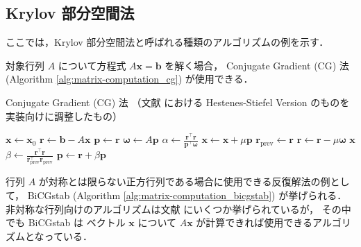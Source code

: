 \clearpage

\subsection{Krylov 部分空間法}\label{sec:linear_krylov-subspace-method}

ここでは，Krylov 部分空間法と呼ばれる種類のアルゴリズムの例を示す．

対象行列 $A$ について方程式 $A \bm{x} = \bm{b}$ を解く場合，
Conjugate Gradient (CG) 法 (Algorithm \ref{alg:matrix-computation_cg})
が使用できる．

\begin{algorithm}[tp]
    \caption{Conjugate Gradient (CG) 法 （文献 \cite{Golub2013} における Hestenes-Stiefel Version のものを実装向けに調整したもの）}
    \label{alg:matrix-computation_cg}
    \begin{algorithmic}[1]
        \State $\bm{x} \gets \bm{x}_0$
        \State $\bm{r} \gets \bm{b} - A \bm{x}$
        \State $\bm{p} \gets \bm{r}$
        \Loop
        \State $\bm{\omega} \gets A \bm{p}$
        \State $\alpha \gets \frac{\displaystyle \bm{r}^\top \bm{r}}{\displaystyle \bm{p}^\top \bm{\omega}}$
        \State $\bm{x} \gets \bm{x} + \mu \bm{p}$
        \State $\bm{r}_{\text{prev}} \gets \bm{r}$
        \State $\bm{r} \gets \bm{r} - \mu \bm{\omega}$
        \State \Return $\bm{x}$
        \EndIf
        \State $\beta \gets \frac{\displaystyle \bm{r}^\top \bm{r}}{\displaystyle \bm{r}_{\text{prev}}^\top \bm{r}_{\text{prev}}}$
        \State $\bm{p} \gets \bm{r} + \beta \bm{p}$
        \EndLoop
        \EndProcedure
    \end{algorithmic}
\end{algorithm}

行列 $A$ が対称とは限らない正方行列である場合に使用できる反復解法の例として，
BiCGstab (Algorithm \ref{alg:matrix-computation_bicgstab})
が挙げられる．
非対称な行列向けのアルゴリズムは文献 \cite{Golub2013} にいくつか挙げられているが，
その中でも BiCGstab は
ベクトル $\bm{x}$ について $A \bm{x}$ が計算できれば使用できるアルゴリズムとなっている．

